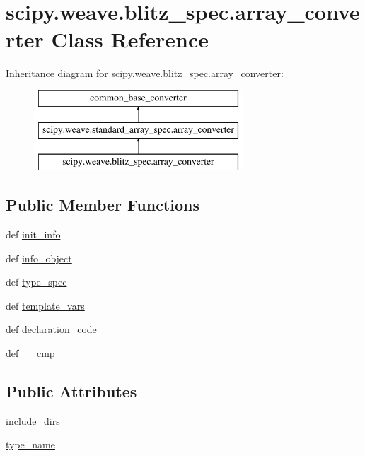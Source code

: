 \hypertarget{classscipy_1_1weave_1_1blitz__spec_1_1array__converter}{}\section{scipy.\+weave.\+blitz\+\_\+spec.\+array\+\_\+converter Class Reference}
\label{classscipy_1_1weave_1_1blitz__spec_1_1array__converter}
Inheritance diagram for scipy.\+weave.\+blitz\+\_\+spec.\+array\+\_\+converter\+:\begin{figure}[H]
\begin{center}
\leavevmode
\includegraphics[height=3.000000cm]{classscipy_1_1weave_1_1blitz__spec_1_1array__converter}
\end{center}
\end{figure}
\subsection*{Public Member Functions}
\begin{DoxyCompactItemize}
\item 
def \hyperlink{classscipy_1_1weave_1_1blitz__spec_1_1array__converter_a68c705009bb94e966bea2d9ea064050f}{init\+\_\+info}
\item 
def \hyperlink{classscipy_1_1weave_1_1blitz__spec_1_1array__converter_a3c465d858fbeee4a1927304fb72fcd33}{info\+\_\+object}
\item 
def \hyperlink{classscipy_1_1weave_1_1blitz__spec_1_1array__converter_a14a4bab47ec0db97e7805c2514c4fb42}{type\+\_\+spec}
\item 
def \hyperlink{classscipy_1_1weave_1_1blitz__spec_1_1array__converter_abdd1cede960266f173d28391d1594afb}{template\+\_\+vars}
\item 
def \hyperlink{classscipy_1_1weave_1_1blitz__spec_1_1array__converter_a237575c7de53ddc3b02c8e9e2615e423}{declaration\+\_\+code}
\item 
def \hyperlink{classscipy_1_1weave_1_1blitz__spec_1_1array__converter_a87f469f22d3f5d3627b52b254fe2c331}{\+\_\+\+\_\+cmp\+\_\+\+\_\+}
\end{DoxyCompactItemize}
\subsection*{Public Attributes}
\begin{DoxyCompactItemize}
\item 
\hyperlink{classscipy_1_1weave_1_1blitz__spec_1_1array__converter_a2879db8689206087189c8d6382942d91}{include\+\_\+dirs}
\item 
\hyperlink{classscipy_1_1weave_1_1blitz__spec_1_1array__converter_a2018f63bd2c5bf9c7f5fb0feb620840b}{type\+\_\+name}
\end{DoxyCompactItemize}


